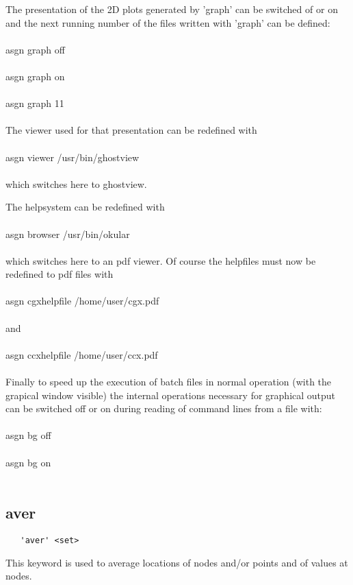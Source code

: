 \documentclass{article}
\begin{document}
The presentation of the 2D plots generated by 'graph' can be switched of or on and the next running number of the files written with 'graph' can be defined:\\\\asgn graph off\\\\asgn graph on\\\\asgn graph 11\\\\
The viewer used for that presentation can be redefined with\\\\asgn viewer /usr/bin/ghostview\\\\which switches here to ghostview.

The helpsystem can be redefined with\\\\asgn browser /usr/bin/okular\\\\which switches here to an pdf viewer. Of course the helpfiles must now be redefined to pdf files with\\\\asgn cgxhelpfile /home/user/cgx.pdf\\\\and\\\\asgn ccxhelpfile /home/user/ccx.pdf\\\\

Finally to speed up the execution of batch files in normal operation (with the grapical window visible) the internal operations necessary for graphical output can be switched off or on during reading of command lines from a file with:\\\\asgn bg off\\\\asgn bg on\\\\

\subsection{\label{aver}aver}
\begin{verbatim}
   'aver' <set>
\end{verbatim}
This keyword is used to average locations of nodes and/or points and of values at nodes.
\end{document}
